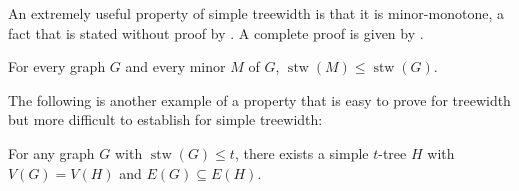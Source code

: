 \documentclass[kpfonts]{patmorin}
\DeclareMathOperator{\stw}{stw}
\theoremstyle{named}
\begin{document}
An extremely useful property of simple treewidth is that it is minor-monotone, a fact that is stated without proof by \citet{knauer.ueckerdt:simple}.  A complete proof is given by \citet[Theorem~5.2]{wulf:stacked}.


\begin{lem}\label{simple-minor-closed}
    For every graph $G$ and every minor $M$ of $G$, $\stw(M)\le\stw(G)$.
\end{lem}

The following is another example of a property that is easy to prove for treewidth but more difficult to establish for simple treewidth:


\begin{lem}\label{simple-subgraph}
    For any graph $G$ with $\stw(G)\le t$, there exists a simple $t$-tree $H$ with $V(G)= V(H)$ and $E(G)\subseteq E(H)$.
\end{lem}
\end{document}
